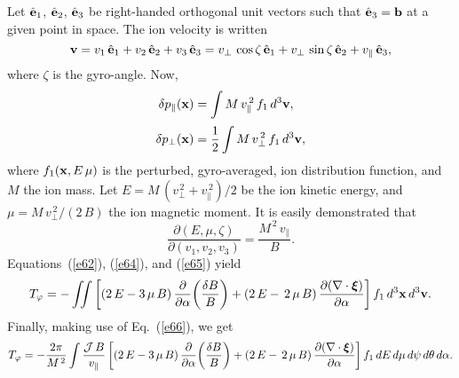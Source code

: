 \documentclass[12pt,prb,aps,notitlepage]{revtex4-1}
\newcommand{\bxi}{\mbox{\boldmath$\xi$}}
\begin{document}
 Let $\hat{\bf e}_1$, $\hat{\bf e}_2$, $\hat{\bf e}_3$ be right-handed orthogonal unit vectors such that $\hat{\bf e}_3={\bf b}$ at a given
 point in space. The ion velocity is written
 \begin{equation}
 {\bf v} = v_1\,\hat{\bf e}_1 + v_2\,\hat{\bf e}_2+v_3\,\hat{\bf e}_3= v_\perp\,\cos\zeta\,\hat{\bf e}_1+ v_\perp\,\sin\zeta\,\hat{\bf e}_2+ 
 v_\parallel\,\hat{\bf e}_3,
 \end{equation}
 where $\zeta$ is the gyro-angle. 
 Now, 
 \begin{align}\label{e64}
 \delta p_\parallel({\bf x}) &= \int M\,v_\parallel^{\,2}\,f_1\,d^3{\bf v},\\[0.5ex]
 \delta p_\perp({\bf x}) &= \frac{1}{2}\int M\,v_\perp^{\,2}\,f_1\,d^3{\bf v},\label{e65}
 \end{align}
 where $f_1({\bf x},E\,\mu)$ is the perturbed, gyro-averaged, ion distribution function, and $M$  the ion mass. Let
 $E=M\,(v_\perp^{\,2}+v_\parallel^{\,2})/2$ be the ion kinetic energy,  and $\mu=M\,v_\perp^{\,2}/(2\,B)$ the ion magnetic moment. 
 It is easily demonstrated that
 \begin{equation}\label{e66}
 \frac{\partial (E,\mu,\zeta)}{\partial(v_1,v_2,v_3)} = \frac{M^{\,2}\,v_\parallel}{B}.
 \end{equation}
 Equations~(\ref{e62}), (\ref{e64}), and (\ref{e65}) yield
 \begin{equation}
 T_\varphi =-\int\!\!\!\int \left[(2\,E-3\,\mu\,B)\,\frac{\partial}{\partial\alpha}\!\left(\frac{\delta B}{B}\right) + (2\,E-\,2\,\mu\,B)\,\frac{\partial(\nabla\cdot\bxi)}{\partial\alpha}\right]f_1\,d^3{\bf x}\,d^3{\bf v}.
 \end{equation}
 Finally, making use of Eq.~(\ref{e66}), we get
 \begin{equation}\label{e92x}
 T_\varphi = -\frac{2\pi}{M^{\,2}}\int \frac{{\cal J}\,B}{v_\parallel}\left[(2\,E-3\,\mu\,B)\,\frac{\partial}{\partial\alpha}\!\left(\frac{\delta B}{B}\right) + (2\,E-\,2\,\mu\,B)\,\frac{\partial(\nabla\cdot\bxi)}{\partial\alpha}\right]f_1\,dE\,d\mu\,d\psi\,d\theta\,d\alpha.
 \end{equation}
 
\end{document}
